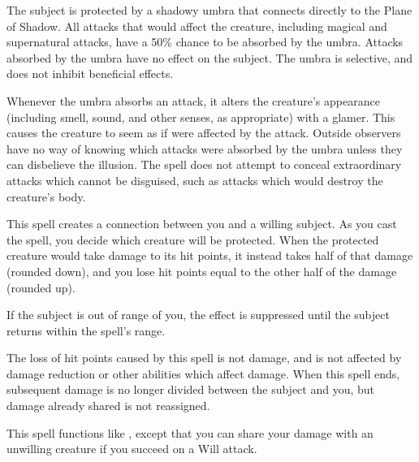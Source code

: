 \spelldur{\durshort}
\begin{spelleffect}
    The subject is protected by a shadowy umbra that connects directly to the Plane of Shadow. All attacks that would affect the creature, including magical and supernatural attacks, have a 50\% chance to be absorbed by the umbra. Attacks absorbed by the umbra have no effect on the subject. The umbra is selective, and does not inhibit beneficial effects.

    Whenever the umbra absorbs an attack, it alters the creature's appearance (including smell, sound, and other senses, as appropriate) with a glamer. This causes the creature to seem as if were affected by the attack. Outside observers have no way of knowing which attacks were absorbed by the umbra unless they can disbelieve the illusion. The spell does not attempt to conceal extraordinary attacks which cannot be disguised, such as attacks which would destroy the creature's body.
\end{spelleffect}

\spelldur{\durlong \dismissable}
\begin{spelleffect}
    This spell creates a connection between you and a willing subject. As you cast the spell, you decide which creature will be protected. When the protected creature would take damage to its hit points, it instead takes half of that damage (rounded down), and you lose hit points equal to the other half of the damage (rounded up).

    If the subject is out of range of you, the effect is suppressed until the subject returns within the spell's range.
\end{spelleffect}
\begin{spellnotes}
    The loss of hit points caused by this spell is not damage, and is not affected by damage reduction or other abilities which affect damage. When this spell ends, subsequent damage is no longer divided between the subject and you, but damage already shared is not reassigned.
\end{spellnotes}

\begin{spelleffect}
    This spell functions like , except that you can share your damage with an unwilling creature if you succeed on a Will attack.
\end{spelleffect}

